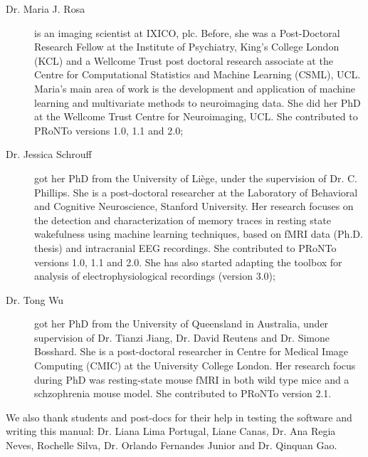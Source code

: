 \begin{description}
	\item[Dr. Maria J. Rosa] is an imaging scientist at IXICO, plc. Before, she was a Post-Doctoral Research Fellow at the Institute of Psychiatry, King's College London (KCL) and a Wellcome Trust post doctoral research associate at the Centre for Computational Statistics and Machine Learning (CSML), UCL. Maria's main area of work is the development and application of machine learning and multivariate methods to neuroimaging data. She did her PhD at the Wellcome Trust Centre for Neuroimaging, UCL. She contributed to PRoNTo versions 1.0, 1.1 and 2.0;
	\item[Dr. Jessica Schrouff] got her PhD from the University of Li\`ege, under the supervision of Dr. C. Phillips. She is a post-doctoral researcher at the Laboratory of Behavioral and Cognitive Neuroscience, Stanford University. Her research focuses on the detection and characterization of memory traces in resting state wakefulness using machine learning techniques, based on fMRI data (Ph.D. thesis) and intracranial EEG recordings. She contributed to PRoNTo versions 1.0, 1.1 and 2.0. She has also started adapting the toolbox for analysis of electrophysiological recordings (version 3.0);
	\item[Dr. Tong Wu] got her PhD from the University of Queensland in Australia, under supervision of Dr. Tianzi Jiang, Dr. David Reutens and Dr. Simone Bosshard. She is a post-doctoral researcher in Centre for Medical Image Computing (CMIC) at the University College London. Her research focus during PhD was resting-state mouse fMRI in both wild type mice and a schzophrenia mouse model. She contributed to PRoNTo version 2.1.    
\end{description}

We also thank students and post-docs for their help in testing the software and writing this manual: Dr. Liana Lima Portugal, Liane Canas, Dr. Ana Regia Neves, Rochelle Silva, Dr. Orlando Fernandes Junior and Dr. Qinquan Gao. 


